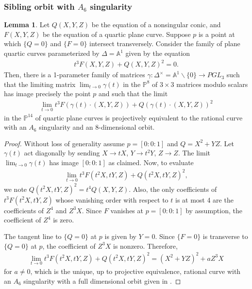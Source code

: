 \documentclass{article}
\theoremstyle{definition}
\newtheorem{lem}[thm]{Lemma}
\newcommand{\mb}{\mathbb}
\begin{document}
\subsubsection{Sibling orbit with $A_6$ singularity}
\begin{lem}
\label{doubleconic}
Let $Q(X,Y,Z)$ be the equation of a nonsingular conic, and $F(X,Y,Z)$ be the equation of a quartic plane curve. Suppose $p$ is a point at which $\{Q=0\}$ and $\{F=0\}$ intersect transversely. Consider the family of plane quartic curves parameterized by $\Delta=\mb{A}^1$ given by the equation
\begin{align*}
    t^3 F(X,Y,Z)+Q(X,Y,Z)^2=0.
\end{align*}
Then, there is a 1-parameter family of matrices $\gamma: \Delta^{\times}=\mb{A}^{1}\backslash\{0\}\to PGL_3$ such that the limiting matrix $\lim_{t\to 0}{\gamma(t)}$ in the $\mb{P}^8$ of $3\times 3$ matrices modulo scalars has image precisely the point $p$ and such that the limit
\begin{align*}
    \lim_{t\to 0}{t^3F(\gamma(t)\cdot (X,Y,Z))+Q(\gamma(t)\cdot (X,Y,Z))^2}
\end{align*}
in the $\mb{P}^{14}$ of quartic plane curves is projectively equivalent to the rational curve with an $A_6$ singularity and an 8-dimensional orbit. 
\end{lem}

\begin{proof}
Without loss of generality assume $p=[0:0:1]$ and $Q=X^2+YZ$. Let $\gamma(t)$ act diagonally by sending $X\to tX$, $Y\to t^2Y$, $Z\to Z$. The limit $\lim_{t\to 0}{\gamma(t)}$ has image $[0:0:1]$ as claimed. Now, to evaluate 
\begin{align*}
    \lim_{t\to 0}{t^3F(t^2X,tY,Z)+Q(t^2X,tY,Z)^2},
\end{align*}
we note $Q(t^2X,tY,Z)^2=t^4Q(X,Y,Z)$. Also, the only coefficients of $t^3F(t^2X,tY,Z)$ whose vanishing order with respect to $t$ is at most 4 are the coefficients of $Z^4$ and $Z^3 X$. Since $F$ vanishes at $p=[0:0:1]$ by assumption, the coefficient of $Z^4$ is zero. 

The tangent line to $\{Q=0\}$ at $p$ is given by $Y=0$. Since $\{F=0\}$ is transverse to $\{Q=0\}$ at $p$, the coefficient of $Z^3X$ is nonzero. Therefore, 
\begin{align*}
    \lim_{t\to 0}{t^3F(t^2X,tY,Z)+Q(t^2X,tY,Z)^2}=(X^2+YZ)^2+aZ^3X
\end{align*}
for $a\neq 0$, which is the unique, up to projective equivalence, rational curve with an $A_6$ singularity with a full dimensional orbit given in \cite[Example 5.4]{AF00}.
\end{proof}
\end{document}
